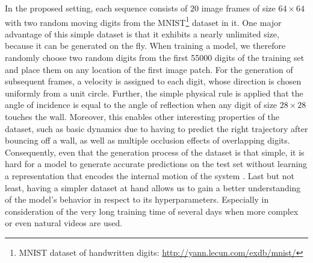 In the proposed setting, each sequence consists of $20$ image frames of size $ 64 \times 64 $ with two random moving digits from the MNIST\footnote{MNIST dataset of handwritten digits: \url{http://yann.lecun.com/exdb/mnist/}} dataset in it. One major advantage of this simple dataset is that it exhibits a nearly unlimited size, because it can be generated on the fly. When training a model, we therefore randomly choose two random digits from the first \num{55000} digits of the training set and place them on any location of the first image patch. For the generation of subsequent frames, a velocity is assigned to each digit, whose direction is chosen uniformly from a unit circle. Further, the simple physical rule is applied that the angle of incidence is equal to the angle of reflection when any digit of size $ 28 \times 28 $ touches the wall. Moreover, this enables other interesting properties of the dataset, such as basic dynamics due to having to predict the right trajectory after bouncing off a wall, as well as multiple occlusion effects of overlapping digits. Consequently, even that the generation process of the dataset is that simple, it is hard for a model to generate accurate predictions on the test set without learning a representation that encodes the internal motion of the system \parencite[p. 6]{conv_lstm_nowcasting}. Last but not least, having a simpler dataset at hand allows us to gain a better understanding of the model's behavior in respect to its hyperparameters. Especially in consideration of the very long training time of several days when more complex or even natural videos are used.

